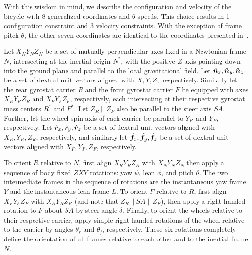 With this wisdom in mind, we describe the configuration and velocity of the
bicycle with 8 generalized coordinates and 6 speeds. This choice results in 1
configuration constraint and 3 velocity constraints. With the exception of
frame pitch $\theta$, the other seven coordinates are identical to the
coordinates presented in~\cite{Meijaard2007}.

Let $X_NY_NZ_N$ be a set of mutually perpendicular axes fixed in a Newtonian
frame $N$, intersecting at the inertial origin $N^*$, with the positive $Z$
axis pointing down into the ground plane and parallel to the local
gravitational field. Let $\hat{\boldsymbol{n}}_{x}, \hat{\boldsymbol{n}}_{y}, \hat{\boldsymbol{n}}_{z}$ be a set of dextral
unit vectors aligned with $X, Y, Z,$ respectively. Similarly let the rear
gyrostat carrier $R$ and the front gyrostat carrier $F$ be equipped with axes
$X_RY_RZ_R$ and $X_FY_FZ_F$, respectively, each intersecting at their
respective gyrostat mass centers $R^*$ and $F^*$. Let $Z_R \parallel Z_F$ also
be parallel to the steer axis $SA$. Further, let the wheel spin axis of each
carrier be parallel to $Y_R$ and $Y_F$, respectively. Let $\hat{\boldsymbol{r}}_{x},
\hat{\boldsymbol{r}}_{y}, \hat{\boldsymbol{r}}_{z}$ be a set of dextral unit vectors aligned with $X_R, Y_R,
Z_R$, respectively, and similarly let $\hat{\boldsymbol{f}}_{x}, \hat{\boldsymbol{f}}_{y}, \hat{\boldsymbol{f}}_{z}$ be a
set of dextral unit vectors aligned with $X_F, Y_F, Z_F$, respectively.

To orient $R$ relative to $N$, first align $X_RY_RZ_R$ with $X_NY_NZ_N$ then
apply a sequence of body fixed $ZXY$ rotations: yaw $\psi$, lean $\phi$, and
pitch $\theta$. The two intermediate frames in the sequence of rotations are
the instantaneous yaw frame $Y$ and the instantaneous lean frame $L$. To orient
$F$ relative to $R$, first align $X_FY_FZ_F$ with $X_RY_RZ_R$ (and note that
$Z_R \parallel SA \parallel Z_F$), then apply a right handed rotation to $F$
about $SA$ by steer angle $\delta$. Finally, to orient the wheels relative to
their respective carrier, apply simple right handed rotations of the wheel
relative to the carrier by angles $\theta_r$ and $\theta_f$, respectively.
These six rotations completely define the orientation of all frames relative to
each other and to the inertial frame $N$.

